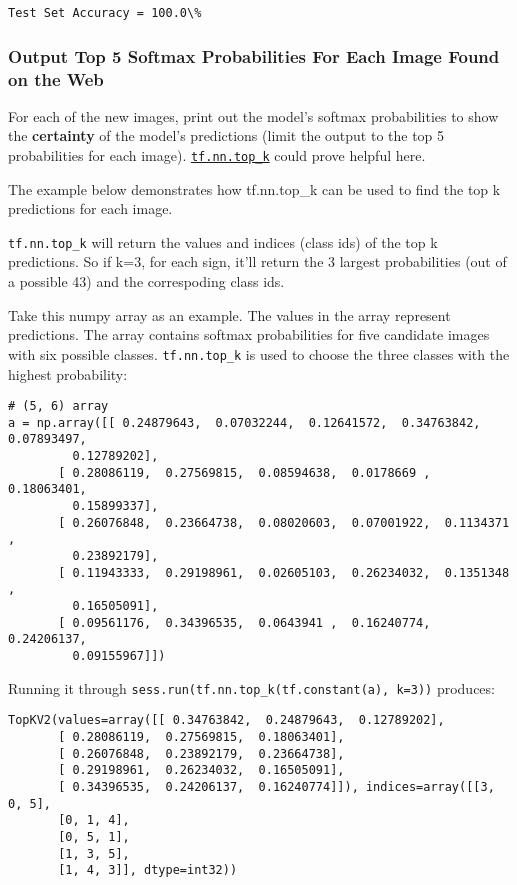 \documentclass[11pt]{article}
\begin{document}
    \begin{Verbatim}[commandchars=\\\{\}]
Test Set Accuracy = 100.0\%

    \end{Verbatim}

    \hypertarget{output-top-5-softmax-probabilities-for-each-image-found-on-the-web}{%
\subsubsection{Output Top 5 Softmax Probabilities For Each Image Found
on the
Web}\label{output-top-5-softmax-probabilities-for-each-image-found-on-the-web}}

    For each of the new images, print out the model's softmax probabilities
to show the \textbf{certainty} of the model's predictions (limit the
output to the top 5 probabilities for each image).
\href{https://www.tensorflow.org/versions/r0.12/api_docs/python/nn.html\#top_k}{\texttt{tf.nn.top\_k}}
could prove helpful here.

The example below demonstrates how tf.nn.top\_k can be used to find the
top k predictions for each image.

\texttt{tf.nn.top\_k} will return the values and indices (class ids) of
the top k predictions. So if k=3, for each sign, it'll return the 3
largest probabilities (out of a possible 43) and the correspoding class
ids.

Take this numpy array as an example. The values in the array represent
predictions. The array contains softmax probabilities for five candidate
images with six possible classes. \texttt{tf.nn.top\_k} is used to
choose the three classes with the highest probability:

\begin{verbatim}
# (5, 6) array
a = np.array([[ 0.24879643,  0.07032244,  0.12641572,  0.34763842,  0.07893497,
         0.12789202],
       [ 0.28086119,  0.27569815,  0.08594638,  0.0178669 ,  0.18063401,
         0.15899337],
       [ 0.26076848,  0.23664738,  0.08020603,  0.07001922,  0.1134371 ,
         0.23892179],
       [ 0.11943333,  0.29198961,  0.02605103,  0.26234032,  0.1351348 ,
         0.16505091],
       [ 0.09561176,  0.34396535,  0.0643941 ,  0.16240774,  0.24206137,
         0.09155967]])
\end{verbatim}

Running it through \texttt{sess.run(tf.nn.top\_k(tf.constant(a),\ k=3))}
produces:

\begin{verbatim}
TopKV2(values=array([[ 0.34763842,  0.24879643,  0.12789202],
       [ 0.28086119,  0.27569815,  0.18063401],
       [ 0.26076848,  0.23892179,  0.23664738],
       [ 0.29198961,  0.26234032,  0.16505091],
       [ 0.34396535,  0.24206137,  0.16240774]]), indices=array([[3, 0, 5],
       [0, 1, 4],
       [0, 5, 1],
       [1, 3, 5],
       [1, 4, 3]], dtype=int32))
\end{verbatim}
\end{document}
